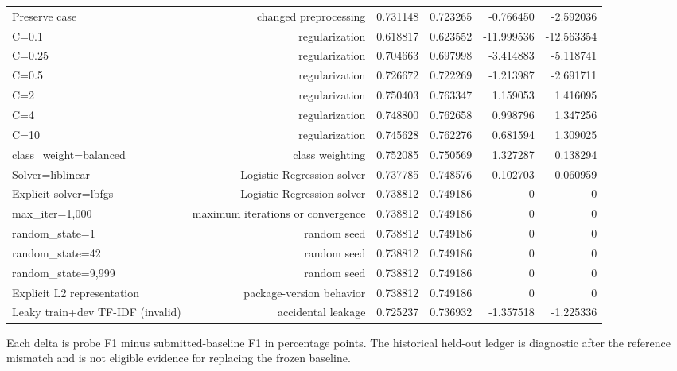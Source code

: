 \begin{table}[t]
\begin{adjustbox}{max width=\textwidth}
\begin{tabular}{lrrrrr}
Preserve case & changed preprocessing & 0.731148 & 0.723265 & -0.766450 & -2.592036 \\
C=0.1 & regularization & 0.618817 & 0.623552 & -11.999536 & -12.563354 \\
C=0.25 & regularization & 0.704663 & 0.697998 & -3.414883 & -5.118741 \\
C=0.5 & regularization & 0.726672 & 0.722269 & -1.213987 & -2.691711 \\
C=2 & regularization & 0.750403 & 0.763347 & 1.159053 & 1.416095 \\
C=4 & regularization & 0.748800 & 0.762658 & 0.998796 & 1.347256 \\
C=10 & regularization & 0.745628 & 0.762276 & 0.681594 & 1.309025 \\
class\_weight=balanced & class weighting & 0.752085 & 0.750569 & 1.327287 & 0.138294 \\
Solver=liblinear & Logistic Regression solver & 0.737785 & 0.748576 & -0.102703 & -0.060959 \\
Explicit solver=lbfgs & Logistic Regression solver & 0.738812 & 0.749186 & 0 & 0 \\
max\_iter=1,000 & maximum iterations or convergence & 0.738812 & 0.749186 & 0 & 0 \\
random\_state=1 & random seed & 0.738812 & 0.749186 & 0 & 0 \\
random\_state=42 & random seed & 0.738812 & 0.749186 & 0 & 0 \\
random\_state=9,999 & random seed & 0.738812 & 0.749186 & 0 & 0 \\
Explicit L2 representation & package-version behavior & 0.738812 & 0.749186 & 0 & 0 \\
Leaky train+dev TF-IDF (invalid) & accidental leakage & 0.725237 & 0.736932 & -1.357518 & -1.225336 \\
\hline
\end{tabular}
\end{adjustbox}
\par\footnotesize{Each delta is probe F1 minus submitted-baseline F1 in percentage points. The historical held-out ledger is diagnostic after the reference mismatch and is not eligible evidence for replacing the frozen baseline.}
\end{table}
